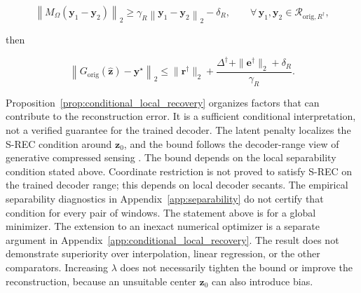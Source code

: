 \begin{proposition}
\begin{equation}
\left\|
M_{\Omega}
(\boldsymbol{y}_1-\boldsymbol{y}_2)
\right\|_2
\geq
\gamma_R
\left\|
\boldsymbol{y}_1-\boldsymbol{y}_2
\right\|_2
-
\delta_R,
\qquad
\forall\,
\boldsymbol{y}_1,\boldsymbol{y}_2
\in
\mathcal{R}_{\mathrm{orig},R^{\dagger}},
\label{eq:local_srec_condition}
\end{equation}

then

\begin{equation}
\left\|
G_{\mathrm{orig}}(\widehat{\boldsymbol{z}})
-
\boldsymbol{y}^{\star}
\right\|_2
\leq
\|\boldsymbol{r}^{\dagger}\|_2
+
\frac{
\Delta^{\dagger}
+
\|\boldsymbol{e}^{\dagger}\|_2
+
\delta_R
}{
\gamma_R
}.
\label{eq:local_recovery_bound}
\end{equation}
\end{proposition}

Proposition~\ref{prop:conditional_local_recovery} organizes factors that
can contribute to the reconstruction error. It is a sufficient conditional
interpretation, not a verified guarantee for the trained decoder. The
latent penalty localizes the S-REC condition around $\boldsymbol{z}_0$,
and the bound follows the decoder-range view of generative compressed
sensing \citep{candes2006stable,bora2017compressed}. The bound depends on
the local separability condition stated above. Coordinate restriction is
not proved to satisfy S-REC on the trained decoder range; this depends on
local decoder secants. The empirical separability diagnostics in
Appendix~\ref{app:separability} do not certify that condition for every
pair of windows. The statement above is for a global minimizer. The
extension to an inexact numerical optimizer is a separate argument in
Appendix~\ref{app:conditional_local_recovery}. The result does not
demonstrate superiority over interpolation, linear regression, or the
other comparators. Increasing $\lambda$ does not necessarily tighten the
bound or improve the reconstruction, because an unsuitable center
$\boldsymbol{z}_0$ can also introduce bias.